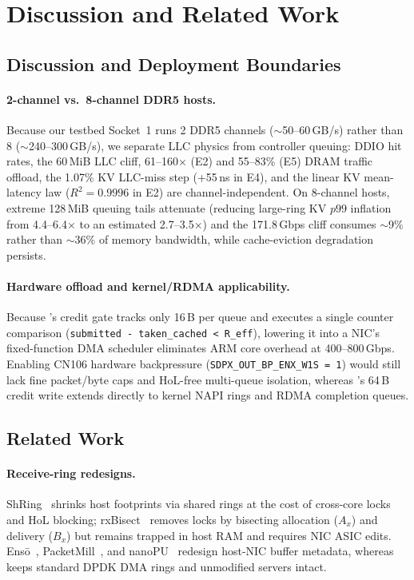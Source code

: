 \section{Discussion and Related Work}
\label{sec:related}

\subsection{Discussion and Deployment Boundaries}
\label{sec:discussion}

\paragraph{2-channel vs.\ 8-channel DDR5 hosts.}
Because our testbed Socket~1 runs 2 DDR5 channels ($\sim$50--60\,GB/s) rather
than 8 ($\sim$240--300\,GB/s), we separate LLC physics from controller queuing:
DDIO hit rates, the 60\,MiB LLC cliff, 61--160$\times$ (E2) and 55--83\% (E5)
DRAM traffic offload, the 1.07\% KV LLC-miss step (+55\,ns in E4), and the
linear KV mean-latency law ($R^2=0.9996$ in E2) are channel-independent. On
8-channel hosts, extreme 128\,MiB queuing tails attenuate (reducing large-ring
KV $p99$ inflation from 4.4--6.4$\times$ to an estimated 2.7--3.5$\times$) and
the 171.8\,Gbps cliff consumes $\sim$9\% rather than $\sim$36\% of memory
bandwidth, while cache-eviction degradation persists.

\paragraph{Hardware offload and kernel/RDMA applicability.}
Because \sys{}'s credit gate tracks only 16\,B per queue and executes a single
counter comparison (\texttt{submitted - taken\_cached < R\_eff}), lowering it
into a NIC's fixed-function DMA scheduler eliminates ARM core overhead at
400--800\,Gbps. Enabling CN106 hardware backpressure
(\texttt{SDPX\_OUT\_BP\_ENX\_W1S = 1}) would still lack fine packet/byte caps
and HoL-free multi-queue isolation, whereas \sys{}'s 64\,B credit write extends
directly to kernel NAPI rings and RDMA completion queues.

\subsection{Related Work}
\label{sec:related-work}

\paragraph{Receive-ring redesigns.}
ShRing~\cite{pismenny2023shring} shrinks host footprints via shared rings at
the cost of cross-core locks and HoL blocking; rxBisect~\cite{pismenny2025rxbisect}
removes locks by bisecting allocation ($A_x$) and delivery ($B_x$) but remains
trapped in host RAM and requires NIC ASIC edits. Ens\={o}~\cite{sadok2023enso},
PacketMill~\cite{farshin2021packetmill}, and nanoPU~\cite{ibanez2021nanopu}
redesign host-NIC buffer metadata, whereas \sys{} keeps standard DPDK DMA rings
and unmodified servers intact.

